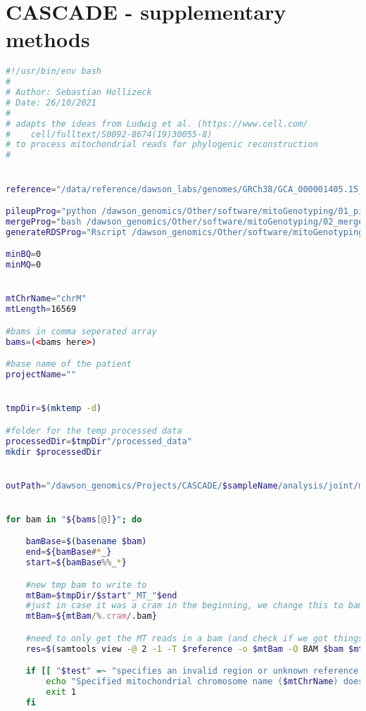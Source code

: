 \chapter{CASCADE - supplementary methods}
\label{ch-cascadeSuppMeth}





\begin{lstlisting}[language=bash, caption=Preprocessing of mitochondrial reads and variants for analysis in R, label={lst-cascadeAppendix:mitoPreProcessing}]
#!/usr/bin/env bash
#
# Author: Sebastian Hollizeck
# Date: 26/10/2021
#
# adapts the ideas from Ludwig et al. (https://www.cell.com/
#    cell/fulltext/S0092-8674(19)30055-8)
# to process mitochondrial reads for phylogenic reconstruction
#


reference="/data/reference/dawson_labs/genomes/GRCh38/GCA_000001405.15_GRCh38_full_analysis_set.fna"

pileupProg="python /dawson_genomics/Other/software/mitoGenotyping/01_pileup_counts.py"
mergeProg="bash /dawson_genomics/Other/software/mitoGenotyping/02_merge_pileup_counts.sh"
generateRDSProg="Rscript /dawson_genomics/Other/software/mitoGenotyping/03_makeRDS.R"

minBQ=0
minMQ=0


mtChrName="chrM"
mtLength=16569

#bams in comma seperated array
bams=(<bams here>)

#base name of the patient
projectName=""


tmpDir=$(mktemp -d)

#folder for the temp processed data
processedDir=$tmpDir"/processed_data"
mkdir $processedDir


outPath="/dawson_genomics/Projects/CASCADE/$sampleName/analysis/joint/mito"


for bam in "${bams[@]}"; do

    bamBase=$(basename $bam)
    end=${bamBase#*_}
    start=${bamBase%%_*}

    #new tmp bam to write to
    mtBam=$tmpDir/$start"_MT_"$end
    #just in case it was a cram in the beginning, we change this to bam
    mtBam=${mtBam/%.cram/.bam}

    #need to only get the MT reads in a bam (and check if we got things)
    res=$(samtools view -@ 2 -1 -T $reference -o $mtBam -O BAM $bam $mtChrName --write-index 2>&1)

    if [[ "$test" =~ "specifies an invalid region or unknown reference. Continue anyway." ]]; then
        echo "Specified mitochondrial chromosome name ($mtChrName) does not exist in bam ($bam)"
        exit 1
    fi


\end{lstlisting}
